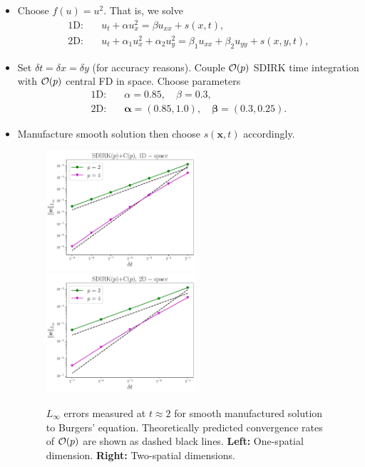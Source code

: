 \documentclass[review]{siamart}
\begin{document}
\begin{itemize}
\setlength\itemsep{0.5em}
\item Choose $f(u) = u^2$. That  is, we solve
\begin{align*}
\textrm{1D:}\quad &u_t + \alpha u^2_x = \beta u_{xx} + s(x,t),\\
\textrm{2D:}\quad &u_t + \alpha_1 u^2_x + \alpha_2 u^2_y = \beta_1 u_{xx} + \beta_2 u_{yy}  + s(x,y,t),
\end{align*}

\item Set $\delta t = \delta x = \delta y$ (for accuracy reasons). Couple ${\cal O}(p)$ SDIRK time integration with ${\cal O}(p)$ central FD in space. Choose parameters
\begin{align*}
\textrm{1D:}\quad &\alpha = 0.85, \quad \beta =0.3,\\
\textrm{2D:}\quad &\bm{\alpha}= (0.85,1.0), \quad \bm{\beta} =(0.3,0.25).
\end{align*}

\item Manufacture smooth solution then choose $s(\bm{x},t)$ accordingly.

\begin{figure}[htb!]
\centerline{
\includegraphics[width = 0.525\textwidth]{../figures/SDIRKd1_ex1}
\quad
\includegraphics[width = 0.525\textwidth]{../figures/SDIRKd2_ex1}
}
\caption{$L_{\infty}$ errors measured at $t \approx 2$ for smooth manufactured solution to Burgers' equation. Theoretically predicted convergence rates of ${\cal O}(p)$ are shown as dashed black lines. \textbf{Left:} One-spatial dimension. \textbf{Right:} Two-spatial dimensions.
\label{fig:errors}
}
\end{figure}


\end{itemize}
\end{document}

